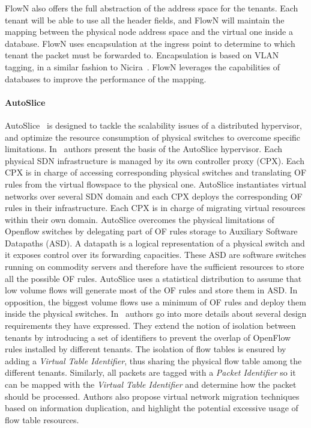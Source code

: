 FlowN also offers the full abstraction of the address space for the tenants.
Each tenant will be able to use all the header fields, and FlowN will maintain the mapping between the physical node address space and the virtual one inside a database. FlowN uses encapsulation at the ingress point to determine to which tenant the packet must be forwarded to. Encapsulation is based on VLAN tagging, in a similar fashion to Nicira~\cite{nicira}.   
FlowN leverages the capabilities of databases to improve the performance of the mapping.


\paragraph{AutoSlice}
AutoSlice~\cite{AutoSlice-Bozakov2012} is designed to tackle the scalability issues of a distributed hypervisor, and optimize the resource consumption of physical switches to overcome specific limitations.
In~\cite{AutoSlice-Bozakov2012} authors present the basis of the AutoSlice hypervisor.
Each physical SDN infrastructure is managed by its own controller proxy (CPX).
Each CPX is in charge of accessing corresponding physical switches and translating OF rules from the virtual flowspace to the physical one.
AutoSlice instantiates virtual networks over several SDN domain and each CPX deploys the corresponding OF rules in their infrastructure.
Each CPX is in charge of migrating virtual resources within their own domain.
AutoSlice overcomes the physical limitations of Openflow switches by delegating part of OF rules storage to Auxiliary Software Datapaths (ASD).
A datapath is a logical representation of a physical switch and it exposes control over its forwarding capacities.
These ASD are software switches running on commodity servers and therefore have the sufficient resources to store all the possible OF rules.
AutoSlice uses a statistical distribution to assume that low volume flows will generate most of the OF rules and store them in ASD. In opposition, the biggest volume flows use a minimum of OF rules and deploy them inside the physical switches.
In~\cite{AutoSlice2-Bozakov2014} authors go into more details about several design requirements they have expressed. They extend the notion of isolation between tenants by introducing a set of identifiers to prevent the overlap of OpenFlow rules installed by different tenants.
The isolation of flow tables is ensured by adding a \textit{Virtual Table Identifier}, thus sharing the physical flow table among the different tenants.
Similarly, all packets are tagged with a \textit{Packet Identifier} so it can be mapped with the \textit{Virtual Table Identifier} and determine how the packet should be processed.
Authors also propose virtual network migration techniques based on information duplication, and highlight the potential excessive usage of flow table resources.

